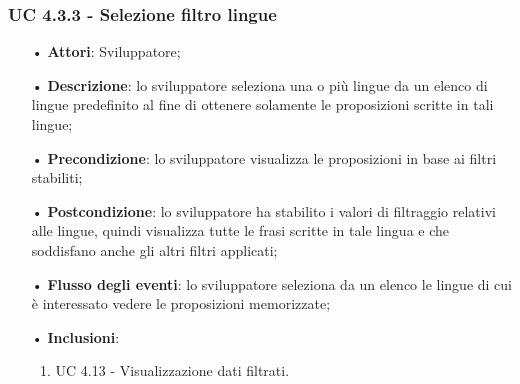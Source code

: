 \subsubsection{UC 4.3.3 -  Selezione filtro lingue}
\begin{itemize}
	\item[•]\textbf{Attori}: Sviluppatore;
	\item[•]\textbf{Descrizione}: lo sviluppatore seleziona una o più lingue da un elenco di lingue predefinito al fine di ottenere solamente le proposizioni scritte in tali lingue;
	\item[•]\textbf{Precondizione}: lo sviluppatore visualizza le proposizioni in base ai filtri stabiliti;
	\item[•]\textbf{Postcondizione}: lo sviluppatore ha stabilito i valori di filtraggio relativi alle lingue, quindi visualizza tutte le frasi scritte in tale lingua e che soddisfano anche gli altri filtri applicati;
	\item[•]\textbf{Flusso degli eventi}: lo sviluppatore seleziona da un elenco le lingue di cui è interessato vedere le proposizioni memorizzate;
	\item[•]\textbf{Inclusioni}:
	\begin{enumerate}
		\item UC 4.13 - Visualizzazione dati filtrati.
	\end{enumerate}
\end{itemize}

